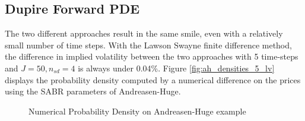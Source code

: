 \documentclass[]{rAMF2e}
\begin{document}
\subsection{Dupire Forward PDE}
The two different approaches result in the same smile, even with a relatively small number of time steps. With the Lawson Swayne finite difference method, the difference in implied volatility between the two approaches with 5 time-steps and $J=50, n_{sd}=4$ is always under 0.04\%. Figure \ref{fig:ah_densities_5_lv} displays the probability density computed by a numerical difference on the prices using the SABR parameters of Andreasen-Huge.
\begin{figure}[htb]
  \begin{center}  
    \end{center}
     \caption{\label{fig:ah_densities_lv} Numerical Probability Density on Andreasen-Huge example}
\end{figure}
\end{document}
